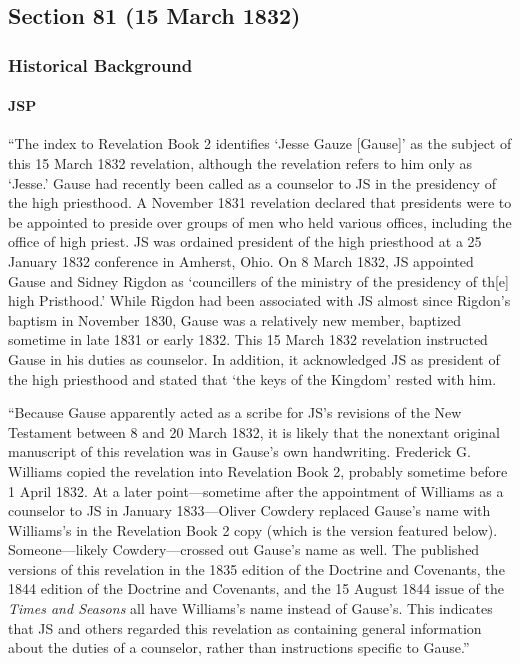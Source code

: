 \subsection{Section 81 (15 March 1832)}
	\label{DC81}
	
	\subsubsection{Historical Background}
		\label{DC81-HB}
		
		\paragraph{JSP}
		
			``The index to Revelation Book 2 identifies `Jesse Gauze [Gause]' as the subject of this 15 March 1832 revelation, although the revelation refers to him only as `Jesse.' Gause had recently been called as a counselor to JS in the presidency of the high priesthood. A November 1831 revelation declared that presidents were to be appointed to preside over groups of men who held various offices, including the office of high priest. JS was ordained president of the high priesthood at a 25 January 1832 conference in Amherst, Ohio. On 8 March 1832, JS appointed Gause and Sidney Rigdon as `councillers of the ministry of the presidency of th[e] high Pristhood.' While Rigdon had been associated with JS almost since Rigdon's baptism in November 1830, Gause was a relatively new member, baptized sometime in late 1831 or early 1832. This 15 March 1832 revelation instructed Gause in his duties as counselor. In addition, it acknowledged JS as president of the high priesthood and stated that `the keys of the Kingdom' rested with him.
			
			``Because Gause apparently acted as a scribe for JS's revisions of the New Testament between 8 and 20 March 1832, it is likely that the nonextant original manuscript of this revelation was in Gause's own handwriting. Frederick G. Williams copied the revelation into Revelation Book 2, probably sometime before 1 April 1832. At a later point---sometime after the appointment of Williams as a counselor to JS in January 1833---Oliver Cowdery replaced Gause's name with Williams's in the Revelation Book 2 copy (which is the version featured below). Someone---likely Cowdery---crossed out Gause's name as well. The published versions of this revelation in the 1835 edition of the Doctrine and Covenants, the 1844 edition of the Doctrine and Covenants, and the 15 August 1844 issue of the \textit{Times and Seasons} all have Williams's name instead of Gause's. This indicates that JS and others regarded this revelation as containing general information about the duties of a counselor, rather than instructions specific to Gause.''
			

